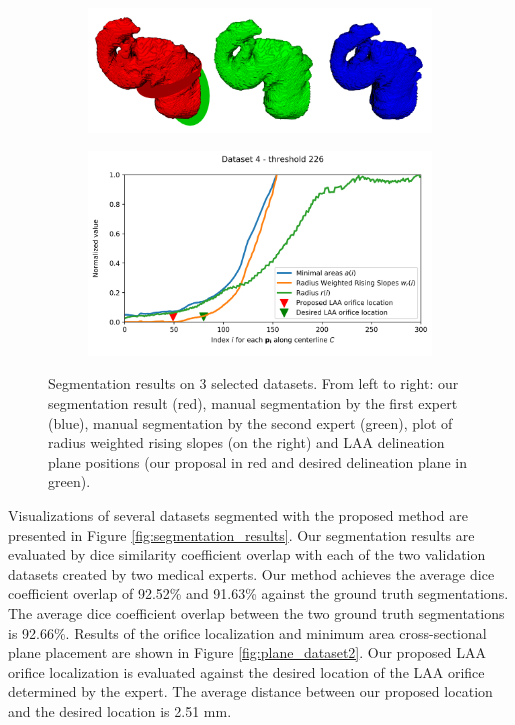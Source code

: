 \documentclass[review]{elsarticle}
\begin{document}
\begin{figure}[]
  \begin{subfigure}[]{.5\linewidth}
    \centering
    \includegraphics[width=\textwidth]{fig14bottomleft.png}
  \end{subfigure}%
  \begin{subfigure}[]{.5\linewidth}
    \centering
    \includegraphics[width=\textwidth]{fig14bottomright.png}
  \end{subfigure}%


  \caption{Segmentation results on 3 selected datasets. From left to right: our segmentation result (red), manual segmentation by the first expert (blue), manual segmentation by the second expert (green), plot of radius weighted rising
    slopes (on the right) and LAA delineation plane positions (our proposal in red and
  desired delineation plane in green). 
  }
  \label{fig:grounds_sidebyside}
\end{figure}



Visualizations of several datasets segmented with the proposed method are
presented in Figure \ref{fig:segmentation_results}. Our segmentation results
are evaluated by dice similarity coefficient overlap with each of the two
validation datasets created by two medical experts. 
Our method achieves the average dice coefficient overlap of 92.52\% and 91.63\%
against the ground truth segmentations.  The average dice coefficient overlap
between the two ground truth segmentations is 92.66\%.  Results of the orifice
localization and minimum area cross-sectional plane placement are shown in
Figure \ref{fig:plane_dataset2}.  Our proposed LAA orifice localization is
evaluated against the desired location of the LAA orifice determined by the
expert. The average distance between our proposed location and the desired
location is 2.51 mm. 
\end{document}
